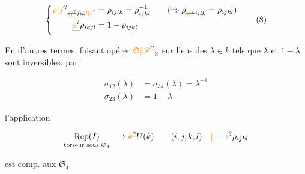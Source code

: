 \[
\left\{\begin{aligned}
\unsure{\rho|f}_{\deleted{\unsure{ij}}j i k\unsure{l|\ell}}&=\rho_{ijlk}=\rho_{ijkl}^{-1} \qquad (\Rightarrow \rho_{\deleted{\unsure{ij}}jilk}=\rho_{ijkl})\\
\deleted{\unsure{\rho}}\rho_{ikjl}&=1-\rho_{ijkl}
\end{aligned}\right. \tag*{(8)}
\]

En d'autres termes, faisant opérer $\unsure{\mathfrak S|\mathscr S}_3$ sur l'ens  des $\lambda\in k$ tels que $\lambda$ et $1-\lambda$ sont inversibles, par

\[
\begin{aligned}
\sigma_{12}(\lambda)&=\sigma_{34}(\lambda)=\lambda^{-1}\\
\sigma_{23}(\lambda)&=1-\lambda
\end{aligned}
\]


 l'application 

\[
\underset{\text{torseur sous }\mathfrak S_4}{\operatorname{Rep}(I)}\longrightarrow \deleted{\unsure{k}}U(k)
\qquad (i,j,k,l)\unsure{\text{---}|\longrightarrow}\rho_{ijkl}
\]

est comp. aux $\mathfrak S_4$
